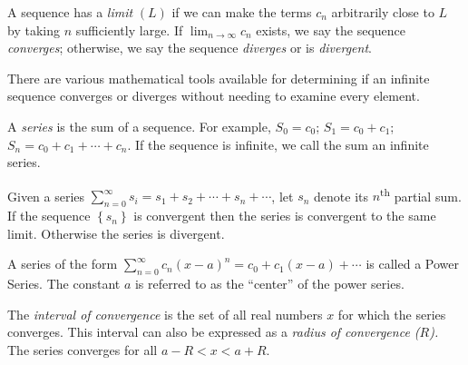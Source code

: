 \begin{definition}
A sequence has a \emph{limit} $(L)$ if we can make the terms $c_n$ arbitrarily close to $L$ by taking $n$ sufficiently large.  If $\lim_{n\to \infty} c_n$ exists, we say the sequence \emph{converges}; otherwise, we say the sequence \emph{diverges} or is \emph{divergent}.
\end{definition}

There are various mathematical tools available for determining if an infinite sequence converges or diverges without needing to examine every element.

\begin{definition}
A \emph{series} is the sum of a sequence. For example, $S_0 = c_0$; $S_1 = c_0+c_1$; $S_n = c_0+c_1+\cdots+c_n$.  If the sequence is infinite, we call the sum an infinite series.
\end{definition}

\begin{definition}
Given a series $\sum_{n=0}^{\infty}s_i=s_1+s_2+\cdots+s_n+\cdots$, let $s_n$ denote its $n$\textsuperscript{th} partial sum.  If the sequence $\left\{s_n \right\}$ is convergent then the series is convergent to the same limit.  Otherwise the series is divergent.
\end{definition}

 
\begin{definition}
A series of the form $\sum_{n=0}^{\infty}c_n(x-a)^n=c_0+c_1(x-a)+\cdots$ is called a Power Series. The constant $a$ is referred to as the ``center'' of the power series.
\end{definition}


\begin{definition}
The \emph{interval of convergence} is the set of all real numbers $x$ for which the series converges.  This interval can also be expressed as a \emph{radius of convergence ($R$).}  The series converges for all $a-R < x < a+R$.
\end{definition}

